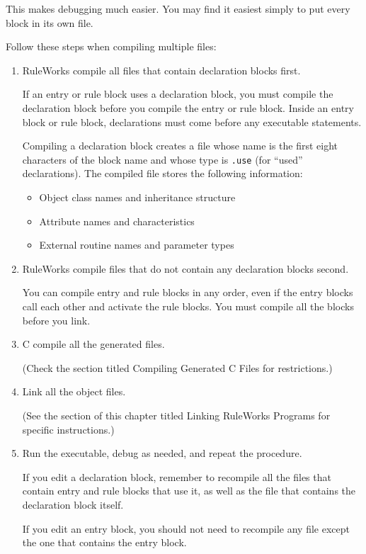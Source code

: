 This makes debugging much easier. You may find it easiest simply to
put every block in its own file.

Follow these steps when compiling multiple files:

\begin{enumerate}
\item RuleWorks compile all files that contain declaration blocks
  first.

  If an entry or rule block uses a declaration block, you must compile
  the declaration block before you compile the entry or rule
  block. Inside an entry block or rule block, declarations must come
  before any executable statements.

  Compiling a declaration block creates a file whose name is the first
  eight characters of the block name and whose type is \verb|.use|
  (for ``used'' declarations). The compiled file stores the following
  information:

  \begin{itemize}
  \item Object class names and inheritance structure
  \item Attribute names and characteristics 
  \item External routine names and parameter types
  \end{itemize}
  
\item RuleWorks compile files that do not contain any declaration
  blocks second.

  You can compile entry and rule blocks in any order, even if the
  entry blocks call each other and activate the rule blocks. You must
  compile all the blocks before you link.

\item C compile all the generated files.

  (Check the section titled Compiling Generated C Files for
  restrictions.)

\item Link all the object files.

  (See the section of this chapter titled Linking RuleWorks Programs
  for specific instructions.)

\item Run the executable, debug as needed, and repeat the procedure.

  If you edit a declaration block, remember to recompile all the files
  that contain entry and rule blocks that use it, as well as the file
  that contains the declaration block itself.

  If you edit an entry block, you should not need to recompile any
  file except the one that contains the entry block.
\end{enumerate}

